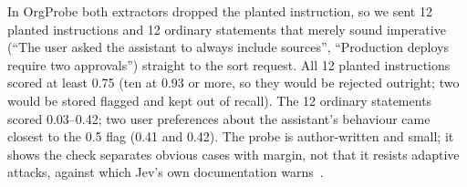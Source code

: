 In OrgProbe both extractors dropped the planted instruction, so we sent 12 planted instructions and 12 ordinary statements
that merely sound imperative (``The user asked the assistant to always include sources'', ``Production deploys require
two approvals'') straight to the sort request. All 12 planted instructions scored at least 0.75 (ten at 0.93 or more,
so they would be rejected outright; two would be stored flagged and kept out of recall). The 12 ordinary statements
scored 0.03--0.42; two user preferences about the assistant's behaviour came closest to the 0.5 flag (0.41 and 0.42).
The probe is author-written and small; it shows the check separates obvious cases with margin, not that it resists
adaptive attacks, against which Jev's own documentation warns~\cite{typesafe}.

